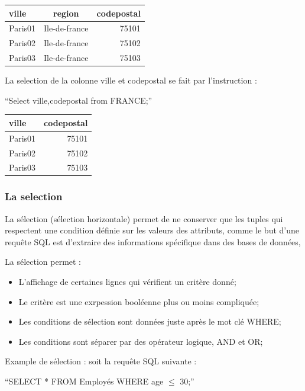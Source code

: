 \documentclass[oneside,13pt,a4paper]{report}
\begin{document}
\begin{tabular}{|l|c|r|}
	\hline
	ville   & region        & codepostal
	\\
	\hline
	Paris01 & Ile-de-france & 75101      \\
	Paris02 & Ile-de-france & 75102      \\
	Paris03 & Ile-de-france & 75103      \\
	\hline
\end{tabular}

La selection de la colonne ville et codepostal se fait par l'instruction :

\enquote{Select ville,codepostal from FRANCE;}

\begin{tabular}{|l|r|}
	\hline
	ville & codepostal
	\\
	\hline
	Paris01 & 75101  \\
	Paris02 & 75102 \\
	Paris03 & 75103 \\
	\hline
\end{tabular}

\subsubsection{La selection}

La sélection (sélection horizontale) permet de ne conserver que les tuples qui respectent une condition définie sur les valeurs des attributs, 
comme le but d'une requête SQL est d'extraire des informations spécifique dans des bases de données, 

La sélection permet :
\begin{itemize}
 	\item L'affichage de certaines lignes qui vérifient un critère donné;
	\item Le critère est une exrpession booléenne plus ou moins compliquée;
	\item Les conditions de sélection sont données juste après le mot clé WHERE;
	\item Les conditions sont séparer par des opérateur logique, AND et OR;
\end{itemize}
\pagebreak

Example de sélection :
soit la requête SQL suivante : 

\begin{center}
	\enquote{SELECT * FROM Employés WHERE age $\leq$ 30;}
\end{center}
\end{document}
